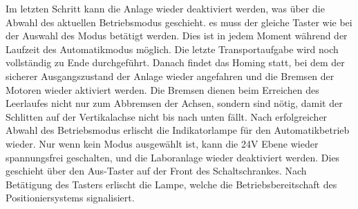 \documentclass[../Bachelorarbeit.tex]{subfiles}
\begin{document}
Im letzten Schritt kann die Anlage wieder deaktiviert werden, was über die Abwahl des aktuellen Betriebsmodus geschieht. es muss der gleiche Taster wie bei der Auswahl des Modus betätigt werden. Dies ist in jedem Moment während der Laufzeit des Automatikmodus möglich. Die letzte Transportaufgabe wird noch vollständig zu Ende durchgeführt. Danach findet das Homing statt, bei dem der sicherer Ausgangszustand der Anlage wieder angefahren und die Bremsen der Motoren wieder aktiviert werden. Die Bremsen dienen beim Erreichen des Leerlaufes nicht nur zum Abbremsen der Achsen, sondern sind nötig, damit der Schlitten auf der Vertikalachse nicht bis nach unten fällt. Nach erfolgreicher Abwahl des Betriebsmodus erlischt die Indikatorlampe für den Automatikbetrieb wieder. Nur wenn kein Modus ausgewählt ist, kann die 24V Ebene wieder spannungsfrei geschalten, und die Laboranlage wieder deaktiviert werden. Dies geschieht über den Aus-Taster auf der Front des Schaltschrankes. Nach Betätigung des Tasters erlischt die Lampe, welche die Betriebsbereitschaft des Positioniersystems signalisiert.\\
\end{document}
